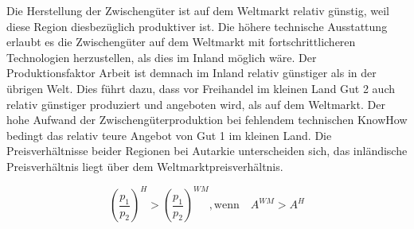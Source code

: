 Die Herstellung der Zwischengüter ist auf dem Weltmarkt relativ günstig, weil diese Region diesbezüglich produktiver ist. Die höhere technische Ausstattung erlaubt es die Zwischengüter auf dem Weltmarkt mit fortschrittlicheren Technologien herzustellen, als dies im Inland möglich wäre. Der Produktionsfaktor Arbeit ist demnach im Inland relativ günstiger als in der übrigen Welt. Dies führt dazu, dass vor Freihandel im kleinen Land Gut 2 auch relativ günstiger produziert und angeboten wird, als auf dem Weltmarkt. Der hohe Aufwand der Zwischengüterproduktion bei fehlendem technischen KnowHow bedingt das relativ teure Angebot von Gut 1 im kleinen Land. Die Preisverhältnisse beider Regionen bei Autarkie unterscheiden sich, das inländische Preisverhältnis liegt über dem Weltmarktpreisverhältnis.


	\begin{equation}
		\left(\frac{p_1}{p_2}\right)^{H}>\left(\frac{p_1}{p_2}\right)^{WM}, \text{wenn} \quad A^{WM}>A^{H}
	\end{equation}


